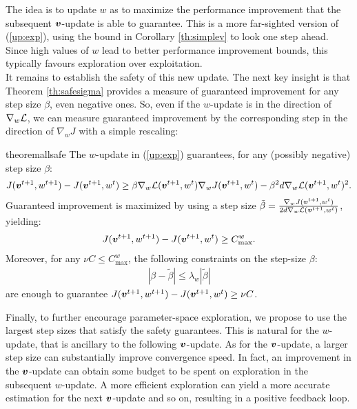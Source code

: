 %
The idea is to update $w$ as to maximize the performance improvement that the subsequent $\vv$-update is able to guarantee. This is a more far-sighted version of (\ref{up:exp}), using the bound in Corollary \ref{th:simplev} to look one step ahead. Since high values of $w$ lead to better performance improvement bounds, this typically favours exploration over exploitation.\\
It remains to establish the safety of this new update. 
The next key insight is that Theorem \ref{th:safesigma} provides a measure of guaranteed improvement for any step size $\beta$, even negative ones. So, even if the $w$-update is in the direction of $\gradDelta$, we can measure guaranteed improvement by the corresponding step in the direction of $\nabla_{w}J$ with a simple rescaling:
\begin{restatable}[]{theorem}{allsafe}\label{th:safe_exp}
	The $w$-update in (\ref{up:exp}) guarantees, for any (possibly negative) step size $\beta$:
	\begin{align*}
	J(\vv^{t+1},w^{t+1}) - J(\vv^{t+1},w^t) \geq \beta\gradDelta(\vv^{t+1},w^t)\gradJ[w]{\vv^{t+1},w^t}-
	\beta^2 d \gradDelta(\vv^{t+1},w^t)^2.
	\end{align*}
	Guaranteed improvement is maximized by using a step size $\tilde{\beta} =\frac{\gradJ[w]{\vv^{t+1},w^t}}{2d\gradDelta(\vv^{t+1},w^t)}$, yielding:
	\begin{align*}
	J(\vv^{t+1},w^{t+1}) - J(\vv^{t+1}, w^t) \geq C_{\text{max}}^w. 
	\end{align*}
	Moreover, for any $\nu C\leq C_{\text{max}}^{w}$, the following constraints on the step-size $\beta$:
	\begin{align}\label{stat:4_3}
	|\beta - \tilde{\beta}| \leq \lambda_{w}|\tilde{\beta}|
	\end{align}
	are enough to guarantee $J(\vv^{t+1},w^{t+1}) - J(\vv^{t+1},w^t)\geq \nu C$.
\end{restatable}
%
Finally, to further encourage parameter-space exploration, we propose to use the largest step sizes that satisfy the safety guarantees. This is natural for the $w$-update, that is ancillary to the following $\vv$-update. As for the $\vv$-update, a larger step size can substantially improve convergence speed. In fact, an improvement in the $\vv$-update can obtain some budget to be spent on exploration in the subsequent $w$-update. A more efficient exploration can yield a more accurate estimation for the next $\vv$-update and so on, resulting in a positive feedback loop. \\
